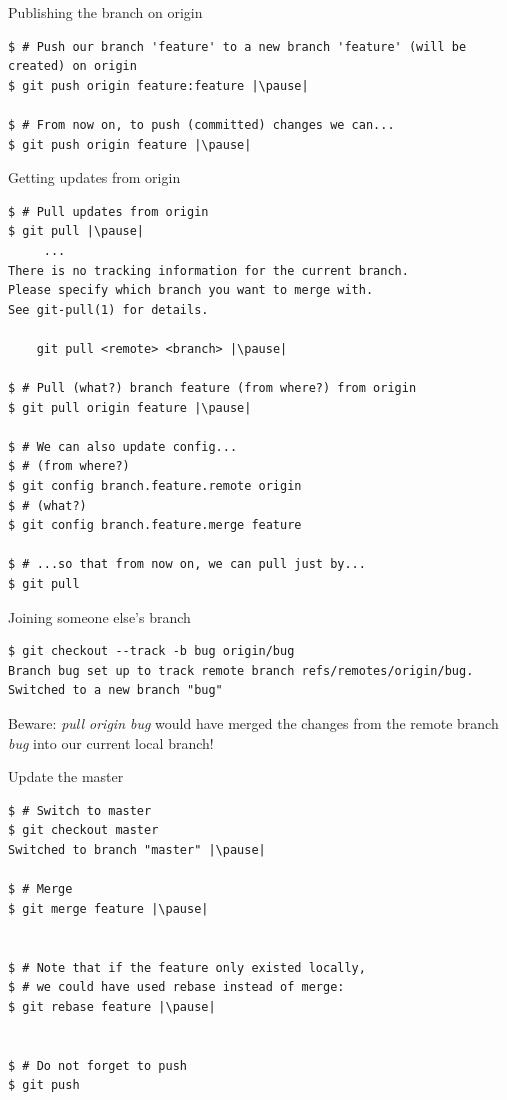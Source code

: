 \begin{frame}[fragile]{Publishing the branch on origin}
	\begin{lstlisting}
$ # Push our branch 'feature' to a new branch 'feature' (will be created) on origin
$ git push origin feature:feature |\pause|

$ # From now on, to push (committed) changes we can...
$ git push origin feature |\pause|
	\end{lstlisting}
\end{frame}

\begin{frame}[fragile]{Getting updates from origin}
	\begin{lstlisting}
$ # Pull updates from origin
$ git pull |\pause|
     ...
There is no tracking information for the current branch.
Please specify which branch you want to merge with.
See git-pull(1) for details.

    git pull <remote> <branch> |\pause|
    
$ # Pull (what?) branch feature (from where?) from origin
$ git pull origin feature |\pause|

$ # We can also update config...
$ # (from where?)
$ git config branch.feature.remote origin
$ # (what?)
$ git config branch.feature.merge feature

$ # ...so that from now on, we can pull just by...
$ git pull
	\end{lstlisting}
\end{frame}


\begin{frame}[fragile]{Joining someone else's branch}
	\begin{lstlisting}
$ git checkout --track -b bug origin/bug
Branch bug set up to track remote branch refs/remotes/origin/bug.
Switched to a new branch "bug"
	\end{lstlisting}
	
	\pause
	\begin{tiny}
	{\color{eclipsePurple} Beware:} \textit{pull origin bug} would have merged the changes from the remote branch \textit{bug} into our current local branch!
\end{tiny}
\end{frame}

\begin{frame}[fragile]{Update the master}
  	\begin{lstlisting}
$ # Switch to master
$ git checkout master
Switched to branch "master" |\pause|

$ # Merge
$ git merge feature |\pause|


$ # Note that if the feature only existed locally, 
$ # we could have used rebase instead of merge:
$ git rebase feature |\pause|


$ # Do not forget to push
$ git push
	\end{lstlisting}
\end{frame}


